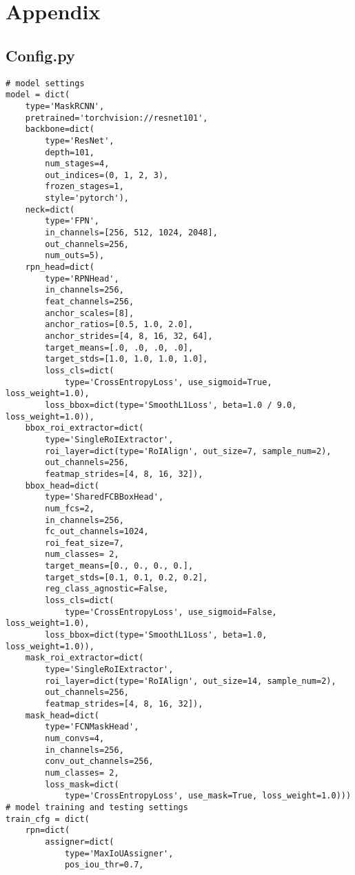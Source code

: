 \chapter{Appendix}

\section{Config.py}

\begin{verbatim}
# model settings
model = dict(
    type='MaskRCNN',
    pretrained='torchvision://resnet101',
    backbone=dict(
        type='ResNet',
        depth=101,
        num_stages=4,
        out_indices=(0, 1, 2, 3),
        frozen_stages=1,
        style='pytorch'),
    neck=dict(
        type='FPN',
        in_channels=[256, 512, 1024, 2048],
        out_channels=256,
        num_outs=5),
    rpn_head=dict(
        type='RPNHead',
        in_channels=256,
        feat_channels=256,
        anchor_scales=[8],
        anchor_ratios=[0.5, 1.0, 2.0],
        anchor_strides=[4, 8, 16, 32, 64],
        target_means=[.0, .0, .0, .0],
        target_stds=[1.0, 1.0, 1.0, 1.0],
        loss_cls=dict(
            type='CrossEntropyLoss', use_sigmoid=True, loss_weight=1.0),
        loss_bbox=dict(type='SmoothL1Loss', beta=1.0 / 9.0, loss_weight=1.0)),
    bbox_roi_extractor=dict(
        type='SingleRoIExtractor',
        roi_layer=dict(type='RoIAlign', out_size=7, sample_num=2),
        out_channels=256,
        featmap_strides=[4, 8, 16, 32]),
    bbox_head=dict(
        type='SharedFCBBoxHead',
        num_fcs=2,
        in_channels=256,
        fc_out_channels=1024,
        roi_feat_size=7,
        num_classes= 2,
        target_means=[0., 0., 0., 0.],
        target_stds=[0.1, 0.1, 0.2, 0.2],
        reg_class_agnostic=False,
        loss_cls=dict(
            type='CrossEntropyLoss', use_sigmoid=False, loss_weight=1.0),
        loss_bbox=dict(type='SmoothL1Loss', beta=1.0, loss_weight=1.0)),
    mask_roi_extractor=dict(
        type='SingleRoIExtractor',
        roi_layer=dict(type='RoIAlign', out_size=14, sample_num=2),
        out_channels=256,
        featmap_strides=[4, 8, 16, 32]),
    mask_head=dict(
        type='FCNMaskHead',
        num_convs=4,
        in_channels=256,
        conv_out_channels=256,
        num_classes= 2,
        loss_mask=dict(
            type='CrossEntropyLoss', use_mask=True, loss_weight=1.0)))
# model training and testing settings
train_cfg = dict(
    rpn=dict(
        assigner=dict(
            type='MaxIoUAssigner',
            pos_iou_thr=0.7,

\end{verbatim}
